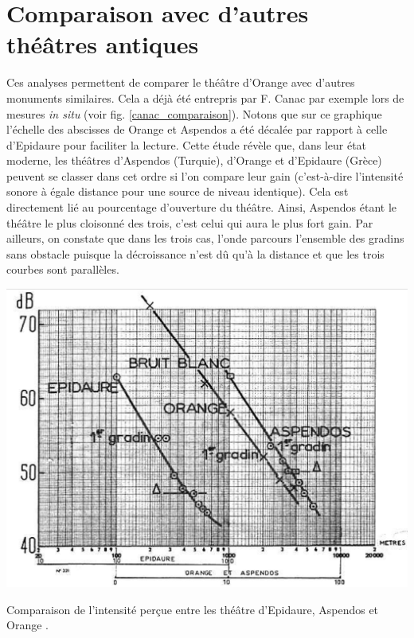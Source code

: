 \section{Comparaison avec d'autres théâtres antiques} \label{sect_comptheatre}
Ces analyses permettent de comparer le théâtre d'Orange avec d'autres monuments similaires. Cela a déjà été entrepris par F. Canac par exemple lors de mesures \textit{in situ} (voir fig. \ref{canac_comparaison}). Notons que sur ce graphique l'échelle des abscisses de Orange et Aspendos a été décalée par rapport à celle d'Epidaure pour faciliter la lecture. Cette étude \cite[137-162]{canac} révèle que, dans leur état moderne, les théâtres d'Aspendos (Turquie), d'Orange et d'Epidaure (Grèce) peuvent se classer dans cet ordre si l'on compare leur gain (c'est-à-dire l'intensité sonore à égale distance pour une source de niveau identique). Cela est directement lié au pourcentage d'ouverture du théâtre. Ainsi, Aspendos étant le théâtre le plus cloisonné des trois, c'est celui qui aura le plus fort gain. Par ailleurs, on constate que dans les trois cas, l'onde parcours l'ensemble des gradins sans obstacle puisque la décroissance n'est dû qu'à la distance et que les trois courbes sont parallèles.
%
\begin{figureth}
	\includegraphics[width=0.7\linewidth]{images/canac_comparaison}
	\caption[Comparaison de l'intensité perçue entre les théâtre d'Epidaure, Aspendos et Orange.]{Comparaison de l'intensité perçue entre les théâtre d'Epidaure, Aspendos et Orange \footnotemark.}
	\label{canac_comparaison}
\end{figureth}


